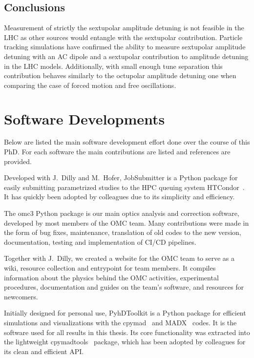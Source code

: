 \subsection*{Conclusions}

Measurement of strictly the sextupolar amplitude detuning is not feasible in the LHC as other sources would entangle with the sextupolar contribution.
Particle tracking simulations have confirmed the ability to measure sextupolar amplitude detuning with an AC dipole and a sextupolar contribution to amplitude detuning in the LHC models.
Additionally, with small enough tune separation this contribution behaves similarly to the octupolar amplitude detuning one when comparing the case of forced motion and free oscillations.

\section{Software Developments}
\label{section:code_developments}

Below are listed the main software development effort done over the course of this PhD.
For each software the main contributions are listed and references are provided.

Developed with J.~Dilly and M.~Hofer, JobSubmitter is a Python package for easily submitting parametrized studies to the HPC queuing system HTCondor~\cite{CODE:Douglas:condor-practice}.
It has quickly been adopted by colleagues due to its simplicity and efficiency.

The omc3 Python package is our main optics analysis and correction software, developed by most members of the \acrshort{OMC} team.
Many contributions were made in the form of bug fixes, maintenance, translation of old codes to the new version, documentation, testing and implementation of CI/CD pipelines.

Together with J.~Dilly, we created a website for the \acrshort{OMC} team to serve as a wiki, resource collection and entrypoint for team members.
It compiles information about the physics behind the OMC activities, experimental procedures, documentation and guides on the team's software, and resources for newcomers.

Initially designed for personal use, PyhDToolkit is a Python package for efficient simulations and visualizations with the cpymad~\cite{CODE:HIBTC:cpymad} and \gls{MADX}~\cite{CODE:MADX_guide} codes.
It is the software used for all results in this thesis.
Its core functionality was extracted into the lightweight cpymadtools~\cite{CODE:Soubelet:cpymadtools} package, which has been adopted by colleagues for its clean and efficient API.

